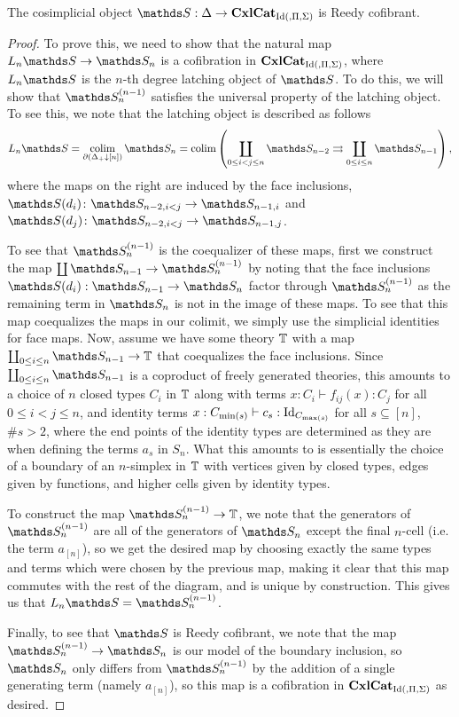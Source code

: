 \documentclass{article}
\begin{document}
\begin{prop}
    The cosimplicial object $\bS:\Delta\to\CxlCat_{\Id(,\Pi,\Sigma)}$ is Reedy cofibrant.
\end{prop}
\begin{proof}
    To prove this, we need to show that the natural map $L_n\bS\to\bS_n$ is a cofibration in $\operatorname{\mathbf{CxlCat}}_{\operatorname{Id}(,\Pi,\Sigma)}$, where $L_n\bS$ is the $n$-th degree latching object of $\bS$. To do this, we will show that $\bS_n^{(n-1)}$ satisfies the universal property of the latching object. To see this, we note that the latching object is described as follows
    $$ L_n\bS=\colim_{\partial(\Delta_+\downarrow[n])}\bS_n=\colim\left(\coprod_{0\leq i<j\leq n}\bS_{n-2}\rightrightarrows\coprod_{0\leq i\leq n}\bS_{n-1}\right), $$
    where the maps on the right are induced by the face inclusions, $\bS(d_i)\colon\bS_{n-2,i<j}\to\bS_{n-1,i}$ and $\bS(d_j)\colon\bS_{n-2,i<j}\to\bS_{n-1,j}$.

    To see that $\bS_n^{(n-1)}$ is the coequalizer of these maps, first we construct the map $\coprod\bS_{n-1}\to\bS_n^{(n-1)}$ by noting that the face inclusions $\bS(d_i):\bS_{n-1}\to\bS_n$ factor through $\bS_n^{(n-1)}$ as the remaining term in $\bS_n$ is not in the image of these maps. To see that this map coequalizes the maps in our colimit, we simply use the simplicial identities for face maps. Now, assume we have some theory $\mathbb{T}$ with a map $\coprod_{0\leq i\leq n}\bS_{n-1}\to\T$ that coequalizes the face inclusions. Since $\coprod_{0\leq i\leq n}\bS_{n-1}$ is a coproduct of freely generated theories, this amounts to a choice of $n$ closed types $C_i$ in $\mathbb{T}$ along with terms $x:C_i\vdash f_{ij}(x):C_j$ for all $0\leq i<j\leq n$, and identity terms $x:C_{\min(s)}\vdash c_s:\operatorname{Id}_{C_{\max(s)}}$ for all $s\subseteq [n]$, $\#s>2$, where the end points of the identity types are determined as they are when defining the terms $a_s$ in $S_{n}$. What this amounts to is essentially the choice of a boundary of an $n$-simplex in $\mathbb{T}$ with vertices given by closed types, edges given by functions, and higher cells given by identity types.

    To construct the map $\bS_{n}^{(n-1)}\to\T$, we note that the generators of $\bS_n^{(n-1)}$ are all of the generators of $\bS_n$ except the final $n$-cell (i.e. the term $a_{[n]}$), so we get the desired map by choosing exactly the same types and terms which were chosen by the previous map, making it clear that this map commutes with the rest of the diagram, and is unique by construction. This gives us that $L_n\bS=\bS_n^{(n-1)}$.

    Finally, to see that $\bS$ is Reedy cofibrant, we note that the map $\bS_n^{(n-1)}\to\bS_n$ is our model of the boundary inclusion, so $\bS_n$ only differs from $\bS_n^{(n-1)}$ by the addition of a single generating term (namely $a_{[n]}$), so this map is a cofibration in $\operatorname{\mathbf{CxlCat}}_{\operatorname{Id}(,\Pi,\Sigma)}$ as desired.
\end{proof}
\end{document}
